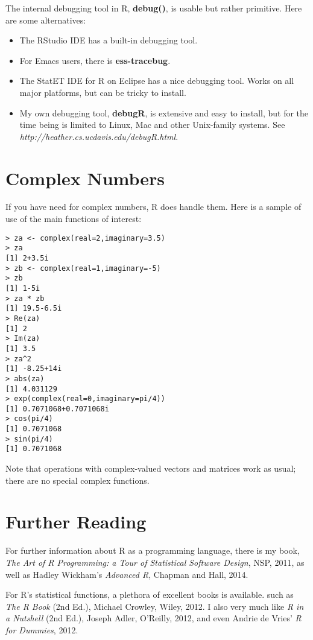 The internal debugging tool in R, {\bf debug()}, is usable but rather
primitive.  Here are some alternatives:

\begin{itemize}

\item The RStudio IDE has a built-in debugging tool.

\item For Emacs users, there is {\bf ess-tracebug}.

\item The StatET IDE for R on Eclipse has a nice debugging tool.  Works
on all major platforms, but can be tricky to install.

\item My own debugging tool, {\bf debugR}, is extensive and easy to
install, but for the time being is limited to Linux, Mac and other
Unix-family systems.  See {\it
http://heather.cs.ucdavis.edu/debugR.html}.

\end{itemize}

\section{Complex Numbers}

If you have need for complex numbers, R does handle them.  Here is a
sample of use of the main functions of interest:

\begin{lstlisting}
> za <- complex(real=2,imaginary=3.5)
> za
[1] 2+3.5i
> zb <- complex(real=1,imaginary=-5)
> zb
[1] 1-5i
> za * zb
[1] 19.5-6.5i
> Re(za)
[1] 2
> Im(za)
[1] 3.5
> za^2
[1] -8.25+14i
> abs(za)
[1] 4.031129
> exp(complex(real=0,imaginary=pi/4))
[1] 0.7071068+0.7071068i
> cos(pi/4)
[1] 0.7071068
> sin(pi/4)
[1] 0.7071068
\end{lstlisting}

Note that operations with complex-valued vectors and matrices work as
usual; there are no special complex functions.

\section{Further Reading}

For further information about R as a programming language, there is my
book, {\it The Art of R Programming: a Tour of Statistical Software
Design}, NSP, 2011, as well as Hadley Wickham's {\it Advanced R},
Chapman and Hall, 2014.

For R's statistical functions, a plethora of excellent books is
available. such as {\it The R Book} (2nd Ed.), Michael Crowley, Wiley,
2012.   I also very much like {\it R in a Nutshell} (2nd Ed.), Joseph Adler,
O'Reilly, 2012, and even Andrie de Vries' {\it R for Dummies}, 2012.
